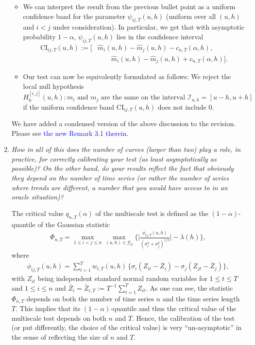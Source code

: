 \documentclass[a4paper,12pt]{article}
\begin{document}
\begin{enumerate}[label=\arabic*.,leftmargin=0.6cm]
\begin{itemize}[leftmargin=0.45cm,itemsep=0pt,topsep=0pt]
\item We can interpret the result from the previous bullet point as a uniform confidence band for the parameter $\psi_{ij,T}(u,h)$ (uniform over all $(u,h)$ and $i < j$ under consideration). In particular, we get that with asymptotic probability $1-\alpha$, $\psi_{ij,T}(u,h)$ lies in the confidence interval
\begin{align*}
\text{CI}_{ij,T}(u,h) := \Big[ & \widehat{m}_{i}(u,h) - \widehat{m}_{j}(u,h) - c_{n,T}(\alpha,h), \\ & \qquad \widehat{m}_{i}(u,h) - \widehat{m}_{j}(u,h) + c_{n,T}(\alpha,h) \Big].
\end{align*}  

\item Our test can now be equivalently formulated as follows: We reject the local null hypothesis
\[ H_0^{[i,j]}(u,h): m_i \text{ and } m_j \text{ are the same on the interval } \mathcal{I}_{u,h} = [u-h,u+h] \]
if the uniform confidence band $\text{CI}_{ij,T}(u,h)$ does not include $0$. 

\end{itemize} 
We have added a condensed version of the above discussion to the revision. Please see \textcolor{blue}{the new Remark 3.1 therein}. 


\item \textit{How in all of this does the number of curves (larger than two) play a role, in practice, for correctly calibrating your test (as least asymptotically as possible)? On the other hand, do your results reflect the fact that obviously they depend on the number of time series (or rather the number of series where trends are different, a number that you would have access to in an oracle situation)?}

The critical value $q_{n,T}(\alpha)$ of the multiscale test is defined as the $(1-\alpha)$-quantile of the Gaussian statistic 
\begin{align}\label{eq:Phi}
\Phi_{n,T} = \max_{1 \le i < j \le n}\max_{(u, h) \in \mathcal{G}_T} \Big\{ \bigg|\frac{\phi_{ij, T}(u, h)}{(\sigma_i^2 + \sigma_j^2)^{1/2}}\bigg| - \lambda(h) \Big\},
\end{align}
where
\begin{align*}
\phi_{ij, T}(u, h) = \sum\limits_{t=1}^T w_{t,T}(u, h) \, \big\{ \sigma_i (Z_{it} - \bar{Z}_i) - \sigma_j (Z_{jt} - \bar{Z}_j) \big\},
\end{align*}
with $Z_{it}$ being independent standard normal random variables for $1 \le t \le T$ and $1 \le i \le n$ and $\bar{Z}_i = \bar{Z}_{i,T} := T^{-1} \sum_{t=1}^T Z_{it}$. As one can see, the statistic $\Phi_{n,T}$ depends on both the number of time series $n$ and the time series length $T$. This implies that its $(1-\alpha)$-quantile and thus the critical value of the multiscale test depends on both $n$ and $T$. Hence, the calibration of the test (or put differently, the choice of the critical value) is very ``un-asymptotic'' in the sense of reflecting the size of $n$ and $T$. 



\end{enumerate}
\end{document}
